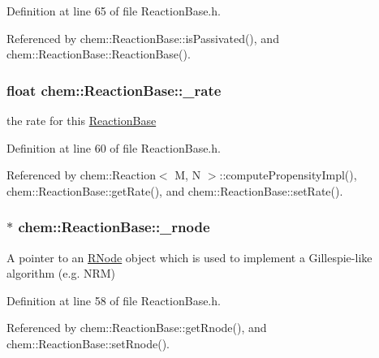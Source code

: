 Definition at line 65 of file Reaction\-Base.\-h.



Referenced by chem\-::\-Reaction\-Base\-::is\-Passivated(), and chem\-::\-Reaction\-Base\-::\-Reaction\-Base().

\hypertarget{classchem_1_1ReactionBase_a787107879dc2a24b789997bac1eb1634}{
\subsubsection[{\-\_\-rate}]{\setlength{\rightskip}{0pt plus 5cm}float {\bf chem\-::\-Reaction\-Base\-::\-\_\-rate}}}\label{classchem_1_1ReactionBase_a787107879dc2a24b789997bac1eb1634}


the rate for this \hyperlink{classchem_1_1ReactionBase}{Reaction\-Base} 



Definition at line 60 of file Reaction\-Base.\-h.



Referenced by chem\-::\-Reaction$<$ M, N $>$\-::compute\-Propensity\-Impl(), chem\-::\-Reaction\-Base\-::get\-Rate(), and chem\-::\-Reaction\-Base\-::set\-Rate().

\hypertarget{classchem_1_1ReactionBase_aedaf23c8b9f80598fc68f715309a6aa3}{
\subsubsection[{\-\_\-rnode}]{$\ast$ {\bf chem\-::\-Reaction\-Base\-::\-\_\-rnode}}}\label{classchem_1_1ReactionBase_aedaf23c8b9f80598fc68f715309a6aa3}


A pointer to an \hyperlink{classchem_1_1RNode}{R\-Node} object which is used to implement a Gillespie-\/like algorithm (e.\-g. N\-R\-M) 



Definition at line 58 of file Reaction\-Base.\-h.



Referenced by chem\-::\-Reaction\-Base\-::get\-Rnode(), and chem\-::\-Reaction\-Base\-::set\-Rnode().

